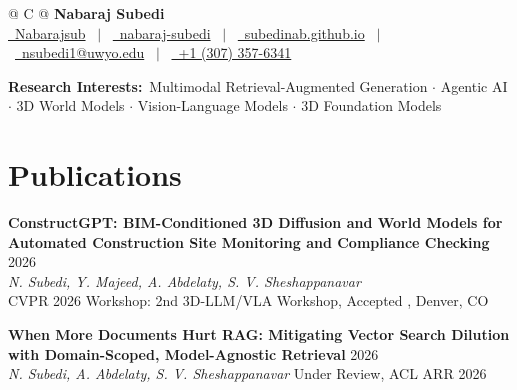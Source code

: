 \documentclass[a4paper,10pt]{article}
\begin{document}
\pagestyle{empty}

\begin{tabularx}{\linewidth}{@{} C @{}}
\textbf{\large{Nabaraj Subedi}} \\[4pt]
\href{https://github.com/Nabarajsub}{\raisebox{-0.05\height}\faGithub\ Nabarajsub} \ $|$ \
\href{https://www.linkedin.com/in/nabaraj-subedi}{\raisebox{-0.05\height}\faLinkedin\ nabaraj-subedi} \ $|$ \
\href{https://subedinab.github.io/}{\raisebox{-0.05\height}\faGlobe\ subedinab.github.io} \ $|$ \
\href{mailto:nsubedi1@uwyo.edu}{\raisebox{-0.05\height}\faEnvelope\ nsubedi1@uwyo.edu} \ $|$ \
\href{tel:+13073576341}{\raisebox{-0.05\height}\faMobile\ +1 (307) 357-6341}
\end{tabularx}

\vspace{3pt}
\noindent\textbf{Research Interests:}\ Multimodal Retrieval-Augmented Generation $\cdot$ Agentic AI $\cdot$ 3D World Models  $\cdot$ Vision-Language Models   $\cdot$ 3D Foundation Models
\vspace{1pt}

\section{Publications}

\textbf{ConstructGPT: BIM-Conditioned 3D Diffusion and World Models for Automated Construction Site Monitoring and Compliance Checking} \hfill 2026\\
\textit{N. Subedi, Y. Majeed, A. Abdelaty, S. V. Sheshappanavar}\\
CVPR 2026 Workshop: 2nd 3D-LLM/VLA Workshop, Accepted , Denver, CO

\textbf{When More Documents Hurt RAG: Mitigating Vector Search Dilution with Domain-Scoped, Model-Agnostic Retrieval} \hfill 2026\\
\textit{N. Subedi, A. Abdelaty, S. V. Sheshappanavar}
Under Review, ACL ARR 2026 
\end{document}
